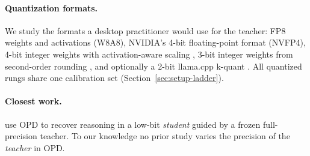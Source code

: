 \paragraph{Quantization formats.} We study the formats a desktop practitioner would use for the
teacher: FP8 weights and activations (W8A8), NVIDIA's 4-bit floating-point format (NVFP4),
4-bit integer weights with activation-aware scaling \citep[AWQ, W4A16, group 128;][]{lin2024awq},
3-bit integer weights from second-order rounding \citep[GPTQ, group 128;][]{frantar2023gptq}, and
optionally a 2-bit llama.cpp k-quant \citep[Q2\_K;][]{llamacpp}. All quantized rungs share one
calibration set (Section~\ref{sec:setup-ladder}).

\paragraph{Closest work.} \citet{quantstudent2026} use OPD to recover reasoning in a low-bit
\emph{student} guided by a frozen full-precision teacher. To our knowledge no prior study varies
the precision of the \emph{teacher} in OPD. 
